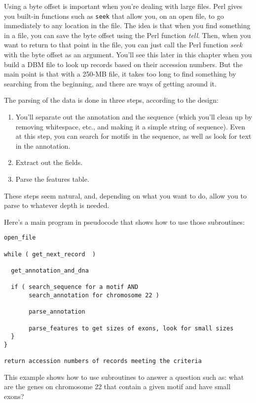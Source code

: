 Using a byte offset is important when you're dealing with large files.  Perl gives you built-in functions such as \verb|seek| that allow you, on an open file, to go immediately to any location in the file. The idea is that when you find something in a file, you can save the byte offset using the Perl function \textit{tell}. Then, when you want to return to that point in the file, you can just call the Perl function \textit{seek} with the byte offset as an argument. You'll see this later in this chapter when you build a DBM file to look up records based on their accession numbers. But the main point is that with a 250-MB file, it takes too long to find something by searching from the beginning, and there are ways of getting around it.

The parsing of the data is done in three steps, according to the design: 

\begin{enumerate}
  \item You'll separate out the annotation and the sequence (which you'll clean up by removing whitespace, etc., and making it a simple string of sequence). Even at this step, you can search for motifs in the sequence, as well as look for text in the annotation.
  \item Extract out the fields.
  \item Parse the features table.
\end{enumerate}

These steps seem natural, and, depending on what you want to do, allow you to parse to whatever depth is needed.  

Here's a main program in pseudocode that shows how to use those subroutines: 

\begin{lstlisting}
open_file 

while ( get_next_record  )

  get_annotation_and_dna

  if ( search_sequence for a motif AND 
       search_annotation for chromosome 22 )

       parse_annotation

       parse_features to get sizes of exons, look for small sizes
  }
}

return accession numbers of records meeting the criteria
\end{lstlisting}

This example shows how to use subroutines to answer a question such as: what are the genes on chromosome 22 that contain a given motif and have small exons? 
  
